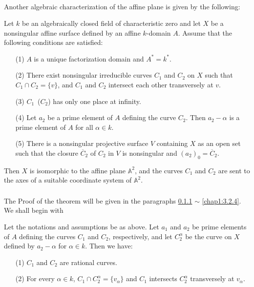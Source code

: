 \subsection{}\label{chap1:3.2}
Another algebraic characterization of the affine plane is given by the
following: 

\begin{theorem*}
Let $k$ be an algebraically closed field of characteristic zero and
let $X$ be a nonsingular affine surface defined by an affine
$k$-domain $A$. Assume that the following conditions are satisfied:
\begin{itemize}
\item[\rm(1)] $A$ is a unique factorization domain and
  $A^{\ast}=k^{\ast}$.

\item[\rm(2)] There exist nonsingular irreducible curves $C_{1}$ and
  $C_{2}$ on $X$ such that $C_{1}\cap C_{2}=\{v\}$, and $C_{1}$ and
  $C_{2}$ intersect each other transversely at $v$.

\item[\rm(3)] $C_{1}$\pageoriginale\ (\resp $C_{2}$) has only one place
  at infinity. 

\item[\rm(4)] Let $a_{2}$ be a prime element of $A$ defining the curve
  $C_{2}$. Then $a_{2}-\alpha$ is a prime element of $A$ for all
  $\alpha\in k$.

\item[\rm(5)] There is a nonsingular projective surface $V$ containing
  $X$ as an open set such that the closure $\overline{C}_{2}$ of
  $C_{2}$ in $V$ is nonsingular and $(a_{2})_{0}=\overline{C}_{2}$.
\end{itemize}
Then $X$ is isomorphic to the affine plane $\mathbb{A}^{2}$, and the
curves $C_{1}$ and $C_{2}$ are sent to the axes of a suitable
coordinate system of $\mathbb{A}^{2}$.
\end{theorem*}

\subsubsection{}\label{chap1:3.2.1}
The Proof of the theorem will be given in the paragraphs \ref{chap1:3.2.1}
$\sim$ \ref{chap1:3.2.4}. We shall begin with

\begin{lemma*}
Let the notations and assumptions be as above. Let $a_{1}$ and $a_{2}$
be prime elements of $A$ defining the curves $C_{1}$ and $C_{2}$,
respectively, and let $C^{\alpha}_{2}$ be the curve on $X$ defined by
$a_{2}-\alpha$ for $\alpha\in k$. Then we have:
\begin{itemize}
\item[\rm(1)] $C_{1}$ and $C_{2}$ are rational curves.

\item[\rm(2)] For every $\alpha\in k$, $C_{1}\cap
  C^{\alpha}_{2}=\{v_{\alpha}\}$ and $C_{1}$ intersects
  $C^{\alpha}_{2}$ transversely at $v_{\alpha}$.
\end{itemize}
\end{lemma*}


